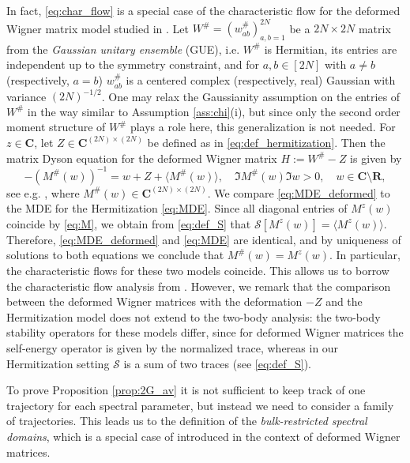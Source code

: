 \documentclass[10pt]{amsart}
\numberwithin{equation}{section}
\newcommand{\R}{\mathbf{R}}
\newcommand{\C}{\mathbf{C}}
\begin{document}
In fact, \eqref{eq:char_flow} is a special case of the characteristic flow for the deformed Wigner matrix model studied in \cite{eigenv_decorr}. Let $W^\#=(w^\#_{ab})_{a,b=1}^{2N}$ be a $2N\times 2N$ matrix from the \emph{Gaussian unitary ensemble} (GUE), i.e. $W^\#$ is Hermitian, its entries are independent up to the symmetry constraint, and for $a,b\in [2N]$ with $a\neq b$ (respectively, $a=b$) $w^\#_{ab}$ is a centered complex (respectively, real) Gaussian with variance $(2N)^{-1/2}$. One may relax the Gaussianity assumption on the entries of $W^\#$ in the way similar to Assumption \ref{ass:chi}(i), but since only the second order moment structure of $W^\#$ plays a role here, this generalization is not needed. For $z\in \C$, let $Z\in\C^{(2N)\times (2N)}$ be defined as in \eqref{eq:def_hermitization}. Then the matrix Dyson equation for the deformed Wigner matrix $H:=W^\# - Z$ is given by
\begin{equation}
-(M^\#(w))^{-1} = w+Z+\langle M^\#(w)\rangle,\quad \Im M^\#(w)\Im w>0,\quad w\in\C\setminus\R,
\label{eq:MDE_deformed}
\end{equation} 
see e.g. \cite[Eq.(1.4)]{eigenv_decorr}, where $M^\#(w)\in \C^{(2N)\times (2N)}$. We compare \eqref{eq:MDE_deformed} to the MDE for the Hermitization \eqref{eq:MDE}. Since all diagonal entries of $M^z(w)$ coincide by \eqref{eq:M}, we obtain from \eqref{eq:def_S} that $\mathcal{S}[M^z(w)]=\langle M^z(w)\rangle$. Therefore, \eqref{eq:MDE_deformed} and \eqref{eq:MDE} are identical, and by uniqueness of solutions to both equations we conclude that $M^\#(w)=M^z(w)$. In particular, the characteristic flows for these two models coincide. This allows us to borrow the characteristic flow analysis from \cite{eigenv_decorr}. However, we remark that the comparison between the deformed Wigner matrices with the deformation $-Z$ and the Hermitization model does not extend to the two-body analysis: the two-body stability operators for these models differ, since for deformed Wigner matrices the self-energy operator is given by the normalized trace, whereas in our Hermitization setting $\mathcal{S}$ is a sum of two traces (see \eqref{eq:def_S}).




To prove Proposition \ref{prop:2G_av} it is not sufficient to keep track of one trajectory for each spectral parameter, but instead we need to consider a family of trajectories. This leads us to the definition of the \emph{bulk-restricted spectral domains}, which is a special case of \cite[Definition 4.2]{eigenv_decorr} introduced in the context of deformed Wigner matrices.
\end{document}
